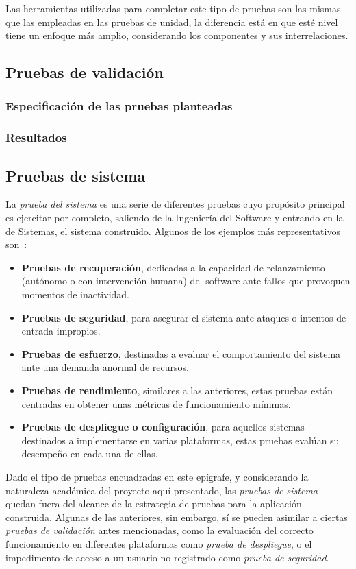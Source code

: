 Las herramientas utilizadas para completar este tipo de pruebas son las mismas que las empleadas en las pruebas de unidad, la diferencia está en que esté nivel tiene un enfoque más amplio, considerando los componentes y sus interrelaciones.


\subsection{Pruebas de validación}

\subsubsection{Especificación de las pruebas planteadas}

\subsubsection{Resultados}

\subsection{Pruebas de sistema}

La \emph{prueba del sistema} es una serie de diferentes pruebas cuyo propósito principal es ejercitar por completo, saliendo de la Ingeniería del Software y entrando en la de Sistemas, el sistema construido. Algunos de los ejemplos más representativos son~\cite{Pre10}:

\begin{itemize}
	\item \textbf{Pruebas de recuperación}, dedicadas a la capacidad de relanzamiento (autónomo o con intervención humana) del software ante fallos que provoquen momentos de inactividad.
	\item \textbf{Pruebas de seguridad}, para asegurar el sistema ante ataques o intentos de entrada impropios.
	\item \textbf{Pruebas de esfuerzo}, destinadas a evaluar el comportamiento del sistema ante una demanda anormal de recursos.
	\item \textbf{Pruebas de rendimiento}, similares a las anteriores, estas pruebas están centradas en obtener unas métricas de funcionamiento mínimas.
	\item \textbf{Pruebas de despliegue o configuración}, para aquellos sistemas destinados a implementarse en varias plataformas, estas pruebas evalúan su desempeño en cada una de ellas.
\end{itemize}

Dado el tipo de pruebas encuadradas en este epígrafe, y considerando la naturaleza académica del proyecto aquí presentado, las \emph{pruebas de sistema} quedan fuera del alcance de la estrategia de pruebas para la aplicación construida. Algunas de las anteriores, sin embargo, sí se pueden asimilar a ciertas \emph{pruebas de validación} antes mencionadas, como la evaluación del correcto funcionamiento en diferentes plataformas como \emph{prueba de despliegue}, o el impedimento de acceso a un usuario no registrado como \emph{prueba de seguridad}.




